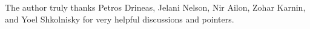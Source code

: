\documentclass[]{article}
\begin{document}
\vspace{.5cm}
 The author truly thanks Petros Drineas, Jelani Nelson, Nir Ailon, Zohar Karnin, and Yoel Shkolnisky for very helpful discussions and pointers.
 
\pagebreak


\end{document}
